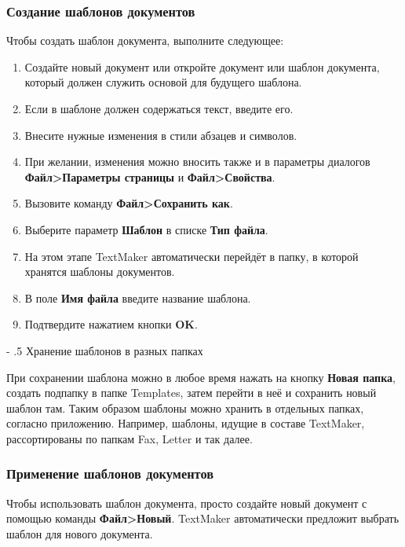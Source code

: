 \documentclass[a4paper,10pt]{article}
\makeatletter
\renewcommand\paragraph{%
   \@startsection{paragraph}{4}{0mm}%
      {-\baselineskip}%
      {.5\baselineskip}%
      {\normalfont\normalsize\bfseries}}
\makeatother
\begin{document}
\subsubsection{Создание шаблонов документов}
Чтобы создать шаблон документа, выполните следующее:
\begin{enumerate}
 \item Создайте новый документ или откройте документ или шаблон документа, который должен служить основой для будущего шаблона.
 \item Если в шаблоне должен содержаться текст, введите его.
 \item Внесите нужные изменения в стили абзацев и символов.
 \item При желании, изменения можно вносить также и в параметры диалогов \textbf{Файл>Параметры страницы} и \textbf{Файл>Свойства}.
 \item Вызовите команду \textbf{Файл>Сохранить как}.
 \item Выберите параметр \textbf{Шаблон} в списке \textbf{Тип файла}.
 \item На этом этапе TextMaker автоматически перейдёт в папку, в которой хранятся шаблоны документов.
 \item В поле \textbf{Имя файла} введите название шаблона.
 \item Подтвердите нажатием кнопки \textbf{OK}.
\end{enumerate}

\paragraph{Хранение шаблонов в разных папках}

При сохранении шаблона можно в любое время нажать на кнопку \textbf{Новая папка}, создать подпапку в папке Templates, затем перейти в неё и сохранить новый шаблон там. Таким образом шаблоны можно хранить в отдельных папках, согласно приложению. Например, шаблоны, идущие в составе TextMaker, рассортированы по папкам Fax, Letter и так далее.

\subsubsection{Применение шаблонов документов}
Чтобы использовать шаблон документа, просто создайте новый документ с помощью команды \textbf{Файл>Новый}. TextMaker автоматически предложит выбрать шаблон для нового документа.
\end{document}
